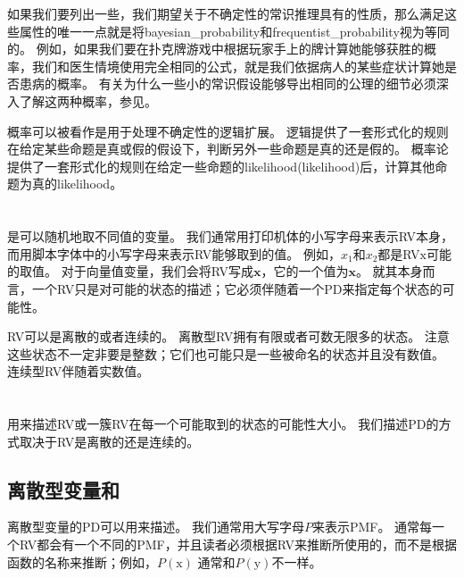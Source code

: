 如果我们要列出一些，我们期望关于不确定性的常识推理具有的性质，那么满足这些属性的唯一一点就是将\gls{bayesian_probability}和\gls{frequentist_probability}视为等同的。
例如，如果我们要在扑克牌游戏中根据玩家手上的牌计算她能够获胜的概率，我们和医生情境使用完全相同的公式，就是我们依据病人的某些症状计算她是否患病的概率。
有关为什么一些小的常识假设能够导出相同的公理的细节必须深入了解这两种概率，参见\cite{Ramsey1926}。


概率可以被看作是用于处理不确定性的逻辑扩展。
逻辑提供了一套形式化的规则在给定某些命题是真或假的假设下，判断另外一些命题是真的还是假的。
概率论提供了一套形式化的规则在给定一些命题的\gls{likelihood}(likelihood)后，计算其他命题为真的\gls{likelihood}。

\section{}
\label{sec:random_variables}

是可以随机地取不同值的变量。
我们通常用打印机体的小写字母来表示\gls{RV}本身，而用脚本字体中的小写字母来表示\gls{RV}能够取到的值。
例如，$x_1$和$x_2$都是\gls{RV}$\mathrm{x}$可能的取值。
对于向量值变量，我们会将\gls{RV}写成$\mathbf{x}$，它的一个值为$\bm{x}$。
就其本身而言，一个\gls{RV}只是对可能的状态的描述；它必须伴随着一个\gls{PD}来指定每个状态的可能性。

\gls{RV}可以是离散的或者连续的。
离散型\gls{RV}拥有有限或者可数无限多的状态。
注意这些状态不一定非要是整数；它们也可能只是一些被命名的状态并且没有数值。
连续型\gls{RV}伴随着实数值。

\section{}
\label{sec:probability_distributions}

用来描述\gls{RV}或一簇\gls{RV}在每一个可能取到的状态的可能性大小。
我们描述\gls{PD}的方式取决于\gls{RV}是离散的还是连续的。

\subsection{离散型变量和}
\label{sec:discrete_variables_and_probability_mass_functions}

离散型变量的\gls{PD}可以用来描述。
我们通常用大写字母$P$来表示\gls{PMF}。
通常每一个\gls{RV}都会有一个不同的\gls{PMF}，并且读者必须根据\gls{RV}来推断所使用的，而不是根据函数的名称来推断；例如，$P(\mathrm{x})$ 通常和$P(\mathrm{y})$不一样。

